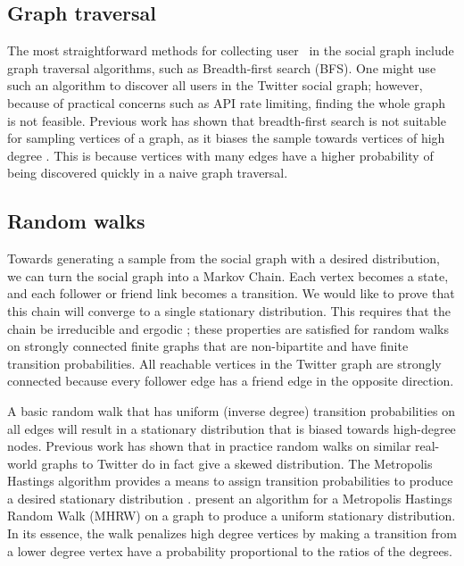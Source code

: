 \subsection{Graph traversal}

The most straightforward methods for collecting user \ids~in the social
graph include graph traversal algorithms, such as Breadth-first
search (BFS). One might use such an algorithm to discover all users in the
Twitter social graph; however, because of practical concerns such as
API rate limiting, finding the whole graph is not feasible. Previous
work has shown that breadth-first search is not suitable for sampling
vertices of a graph, as it biases the sample towards vertices of high
degree \cite{Stutzbach:2006, Minas:2009}. This is because vertices
with many edges have a higher probability of being discovered quickly
in a naive graph traversal.

\subsection{Random walks}

Towards generating a sample from the social graph with a desired
distribution, we can turn the social graph into a Markov Chain. Each
vertex becomes a state, and each follower or friend link becomes a
transition. We would like to prove that this chain will converge to a
single stationary distribution. This requires that the chain be
irreducible and ergodic \cite{Upfal:2005}; these properties are
satisfied for random walks on strongly connected finite graphs that
are non-bipartite and have finite transition probabilities. All
reachable vertices in the Twitter graph are strongly connected because
every follower edge has a friend edge in the opposite direction.

A basic random walk that has uniform (inverse degree) transition
probabilities on all edges will result in a stationary distribution
that is biased towards high-degree nodes. Previous work
\cite{Stutzbach:2006, Minas:2009} has shown that in practice random
walks on similar real-world graphs to Twitter do in fact give a skewed
distribution. The Metropolis Hastings algorithm provides a means to
assign transition probabilities to produce a desired stationary
distribution \cite{Upfal:2005}. \cite{Stutzbach:2006} present an
algorithm for a Metropolis Hastings Random Walk (MHRW) on a graph to
produce a uniform stationary distribution. In its essence, the walk
penalizes high degree vertices by making a transition from a lower
degree vertex have a probability proportional to the ratios of the
degrees.

